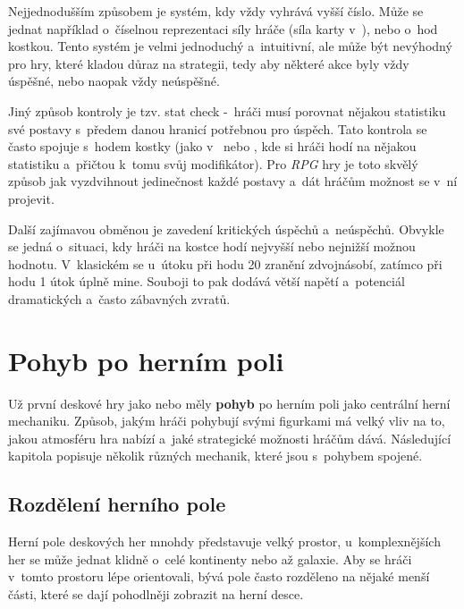 Nejjednodušším způsobem je systém, kdy vždy vyhrává vyšší číslo. Může se jednat například o~číselnou reprezentaci síly hráče (síla karty v~), nebo o~hod kostkou. Tento systém je velmi jednoduchý a~intuitivní, ale může být nevýhodný pro hry, které kladou důraz na strategii, tedy aby některé akce byly vždy úspěšné, nebo naopak vždy neúspěšné.

Jiný způsob kontroly je tzv. stat check -~hráči musí porovnat nějakou statistiku své postavy s~předem danou hranicí potřebnou pro úspěch. Tato kontrola se často spojuje s~hodem kostky (jako v~ nebo , kde si hráči hodí na nějakou statistiku a~přičtou k~tomu svůj modifikátor). Pro \textit{RPG} hry je toto skvělý způsob jak vyzdvihnout jedinečnost každé postavy a~dát hráčům možnost se v~ní projevit.

Další zajímavou obměnou je zavedení kritických úspěchů a~neúspěchů. Obvykle se jedná o~situaci, kdy hráči na kostce hodí nejvyšší nebo nejnižší možnou hodnotu. V~klasickém  se u~útoku při hodu 20 zranění zdvojnásobí, zatímco při hodu 1 útok úplně mine. Souboji to pak dodává větší napětí a~potenciál dramatických a~často zábavných zvratů.



\section{Pohyb po herním poli}
\label{sec:movement}

Už první deskové hry jako  nebo   měly \textbf{pohyb} po herním poli jako centrální herní mechaniku. Způsob, jakým hráči pohybují svými figurkami má velký vliv na to, jakou atmosféru hra nabízí a~jaké strategické možnosti hráčům dává. Následující kapitola popisuje několik různých mechanik, které jsou s~pohybem spojené.

\subsection{Rozdělení herního pole}
\label{subsec:movement_tessellation}

Herní pole deskových her mnohdy představuje velký prostor, u~komplexnějších her se může jednat klidně o~celé kontinenty nebo až galaxie. Aby se hráči v~tomto prostoru lépe orientovali, bývá pole často rozděleno na nějaké menší části, které se dají pohodlněji zobrazit na herní desce.

